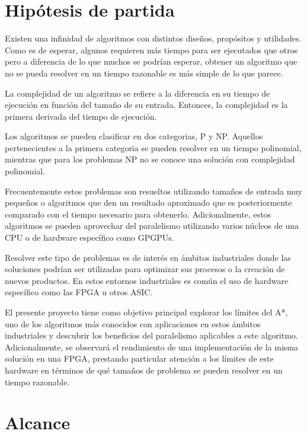 
\section{Hipótesis de partida}

Existen una infinidad de algoritmos con distintos diseños, propósitos y utilidades.
Como es de esperar, algunos requieren más tiempo para ser ejecutados que otros
pero a diferencia de lo que muchos se podrían esperar,
obtener un algoritmo que no se pueda resolver en un tiempo razonable
es más simple de lo que parece.

La complejidad de un algoritmo se refiere a la diferencia
en su tiempo de ejecución en función del tamaño de su entrada.
Entonces, la complejidad es la primera derivada del tiempo
de ejecución.

Los algoritmos se pueden clasificar en dos categorias, P y NP.
Aquellos pertenecientes a la primera categoria se pueden resolver
en un tiempo polinomial,
mientras que para los problemas NP no se conoce una solución
con complejidad polinomial.

Frecuentemente estos problemas son resueltos utilizando
tamaños de entrada muy pequeños o algoritmos
que den un resultado aproximado que es posteriormente
comparado con el tiempo necesario para obtenerlo.
Adicionalmente, estos algoritmos se pueden aprovechar del
paralelismo utilizando varios núcleos de una CPU
o de hardware específico como GPGPUs.

Resolver este tipo de problemas es de interés en ámbitos
industriales donde las soluciones podrían ser utilizadas
para optimizar sus procesos o la creación de nuevos productos.
En estos entornos industriales es común el uso de
hardware específico como las FPGA u otros ASIC.

El presente proyecto tiene como objetivo principal 
explorar los límites del A*, uno de los algoritmos más
conocidos con aplicaciones en estos ámbitos industriales
y descubrir los beneficios del paralelismo aplicables
a este algoritmo.
Adicionalmente, se observará el rendimiento de una implementación
de la misma solución en una FPGA,
prestando particular atención a los límites
de este hardware en términos de qué tamaños de problema
se pueden resolver en un tiempo razonable.

\pagebreak

\section{Alcance}

